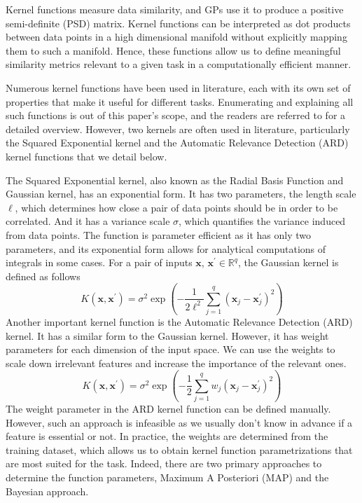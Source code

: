 \documentclass[letterpaper,11pt]{extarticle}
\begin{document}
Kernel functions measure data similarity, and GPs use it to produce a positive semi-definite (PSD) matrix. Kernel functions can be interpreted as dot products between data points in a high dimensional manifold without explicitly mapping them to such a manifold. Hence, these functions allow us to define meaningful similarity metrics relevant to a given task in a computationally efficient manner.  

Numerous kernel functions have been used in literature, each with its own set of properties that make it useful for different tasks. Enumerating and explaining all such functions is out of this paper's scope, and the readers are referred to \cite{RasmussenW06} for a detailed overview. However, two kernels are often used in literature, particularly the Squared Exponential kernel and the Automatic Relevance Detection (ARD) kernel functions that we detail below. 

The Squared Exponential kernel, also known as the Radial Basis Function and Gaussian kernel, has an exponential form. It has two parameters, the length scale $\ell$, which determines how close a pair of data points should be in order to be correlated. And it has a variance scale $\sigma$, which quantifies the variance induced from data points. The function is parameter efficient as it has only two parameters, and its exponential form allows for analytical computations of integrals in some cases.  For a pair of inputs $\mathbf{x}$, $\mathbf{x}^{'} \in \mathbb{R}^q$, the Gaussian kernel is defined as follows
$$
K\left(\mathbf{x}, \mathbf{x}^{'}\right)=\sigma^{2} \exp \left(-\frac{1}{2 \ell^{2}} \sum_{j=1}^{q}\left(\mathbf{x}_{j}-\mathbf{x}^{'}_{j}\right)^{2}\right)
$$
Another important kernel function is the Automatic Relevance Detection (ARD) kernel. It has a similar form to the Gaussian kernel. However, it has weight parameters for each dimension of the input space. We can use the weights to scale down irrelevant features and increase the importance of the relevant ones. 
$$
K\left(\mathbf{x}, \mathbf{x}^{'}\right)=\sigma^{2} \exp \left(-\frac{1}{2} \sum_{j=1}^{q}w_j\left(\mathbf{x}_{j}-\mathbf{x}^{'}_{j}\right)^{2}\right)
$$
The weight parameter in the ARD kernel function can be defined manually. However, such an approach is infeasible as we usually don't know in advance if a feature is essential or not.  In practice, the weights are determined from the training dataset, which allows us to obtain kernel function parametrizations that are most suited for the task. Indeed, there are two primary approaches to determine the function parameters, Maximum A Posteriori (MAP) and the Bayesian approach. 
\end{document}
